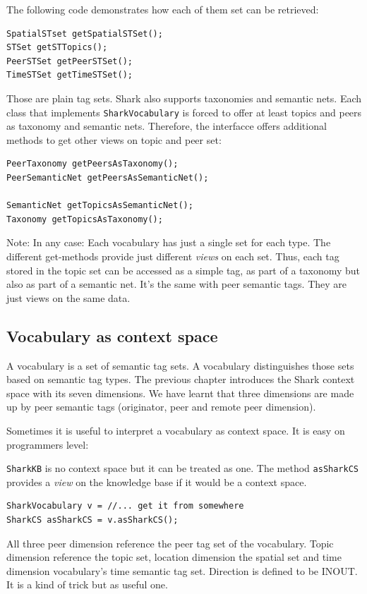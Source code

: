 The following code demonstrates how each of them set can be retrieved:

\begin{verbatim}
SpatialSTset getSpatialSTSet();
STSet getSTTopics();
PeerSTSet getPeerSTSet();
TimeSTSet getTimeSTSet();
\end{verbatim} 

Those are plain tag sets. Shark also supports taxonomies and semantic nets. Each class that implements {\tt SharkVocabulary} is forced to offer at least topics and peers as taxonomy and semantic nets. Therefore, the interfacce offers additional methods to get other views on topic and peer set:

\begin{verbatim}
PeerTaxonomy getPeersAsTaxonomy();
PeerSemanticNet getPeersAsSemanticNet();

SemanticNet getTopicsAsSemanticNet();
Taxonomy getTopicsAsTaxonomy();
\end{verbatim}

Note: In any case: Each vocabulary has just a single set for each type. The different get-methods provide just different {\it views} on each set. Thus, each tag stored in the topic set can be accessed as a simple tag, as part of a taxonomy but also as part of a semantic net. It's the same with peer semantic tags. They are just views on the same data.

\subsection{Vocabulary as context space}
A vocabulary is a set of semantic tag sets. A vocabulary distinguishes those sets based on semantic tag types. The previous chapter introduces the Shark context space with its seven dimensions. We have learnt that three dimensions are made up by peer semantic tags (originator, peer and remote peer dimension).

Sometimes it is useful to interpret a vocabulary as context space. It is easy on programmers level:

{\tt SharkKB} is no context space but it can be treated as one. The method {\tt asSharkCS} provides a {\it view} on the knowledge base if it would be a context space.

\begin{verbatim}
SharkVocabulary v = //... get it from somewhere
SharkCS asSharkCS = v.asSharkCS();
\end{verbatim}

All three peer dimension reference the peer tag set of the vocabulary. Topic dimension reference the topic set, location dimension the spatial set and time dimension vocabulary's time semantic tag set. Direction is defined to be INOUT.
It is a kind of trick but as useful one.

